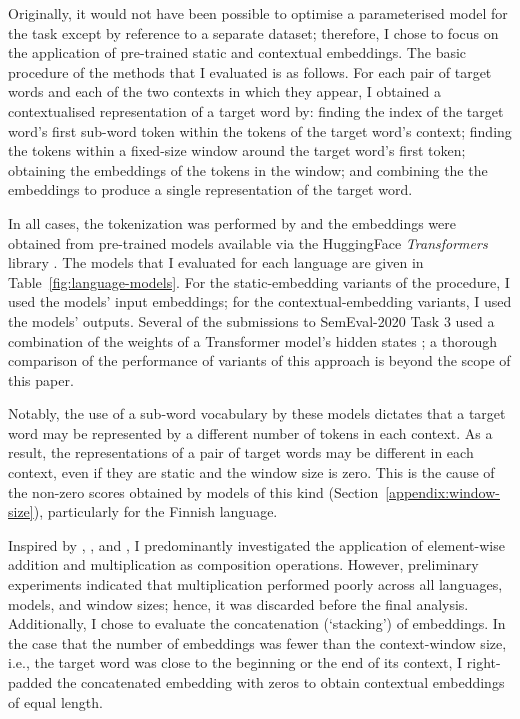 Originally, it would not have been possible to optimise a parameterised model for the
task except by reference to a separate dataset; therefore, I chose to focus on the
application of pre-trained static and contextual embeddings.
The basic procedure of the methods that I evaluated is as follows.
For each pair of target words and each of the two contexts in which they appear, I
obtained a contextualised representation of a target word by:
finding the index of the target word's first sub-word token within the tokens of the target word's context;
finding the tokens within a fixed-size window around the target word's first token;
obtaining the embeddings of the tokens in the window; and
combining the the embeddings to produce a single representation of the target word.

In all cases, the tokenization was performed by and the embeddings were obtained from
pre-trained models available via the HuggingFace \emph{Transformers} library
\parencite{Wolf2020}.
The models that I evaluated for each language are given in Table~\ref{fig:language-models}.
For the static-embedding variants of the procedure, I used the models' input embeddings;
for the contextual-embedding variants, I used the models' outputs.
Several of the submissions to SemEval-2020 Task 3 used a combination of the weights of a
Transformer model's hidden states \parencites[e.g.,][276]{Gamallo2020}[3]{Pessutto2020}[4]{Hettiarachchi2021}; a thorough comparison of the performance of variants
of this approach is beyond the scope of this paper.

Notably, the use of a sub-word vocabulary by these models
\parencite[e.g.,][4174]{Devlin2019} dictates that a target word may be represented by a
different number of tokens in each context.
As a result, the representations of a pair of target words may be different in each
context, even if they are static and the window size is zero.
This is the cause of the non-zero scores obtained by models of this kind
(Section~\ref{appendix:window-size}), particularly for the Finnish language.

Inspired by \textcite{Landauer1997}, \textcite{Kintsch2001}, and
\textcite{Mitchell2008}, I predominantly investigated the application of element-wise
addition and multiplication as composition operations.
However, preliminary experiments indicated that multiplication performed poorly across
all languages, models, and window sizes; hence, it was discarded before the final
analysis.
Additionally, I chose to evaluate the concatenation (`stacking') of embeddings.
In the case that the number of embeddings was fewer than the context-window size, i.e.,
the target word was close to the beginning or the end of its context, I right-padded the
concatenated embedding with zeros to obtain contextual embeddings of equal length.

